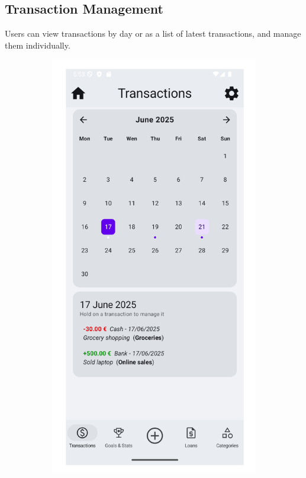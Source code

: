 \documentclass[a4paper,12pt]{article}
\begin{document}
\subsection{Transaction Management}
Users can view transactions by day or as a list of latest transactions, and manage them individually.

\begin{figure}[H]
    \centering
    \begin{subfigure}[b]{0.23\textwidth}
        \includegraphics[width=\textwidth]{transactions_day.png}

\end{subfigure}
\end{figure}
\end{document}
